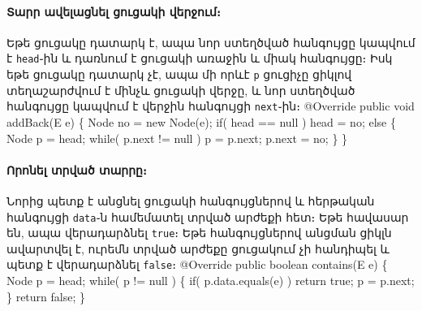 %
%
\paragraph{Տարր ավելացնել ցուցակի վերջում։}
Եթե ցուցակը դատարկ է, ապա նոր ստեղծված հանգույցը կապվում է 
\texttt{head}֊ին և դառնում է ցուցակի առաջին և միակ հանգույցը։
Իսկ եթե ցուցակը դատարկ չէ, ապա մի որևէ \texttt{p} ցուցիչը
ցիկլով տեղաշարժվում է մինչև ցուցակի վերջը, և նոր ստեղծված
հանգույցը կապվում է վերջին հանգույցի \texttt{next}֊ին։
\nwenddocs{}\endmoddef{}
@Override
public void addBack(E e)
\{
  Node no = new Node(e);
  if( head == null )
    head = no;
  else \{
    Node p = head;
    while( p.next != null )
      p = p.next;
    p.next = no;
  \}
\}
\nwendcode{}\nwdocspar

%
%
\paragraph{Որոնել տրված տարրը։}
Նորից պետք է անցնել ցուցակի հանգույցներով և հերթական հանգույցի 
\texttt{data}֊ն համեմատել տրված արժեքի հետ։ Եթե հավասար են, ապա 
վերադարձնել \texttt{true}։ Եթե հանգույցներով անցման ցիկլն 
ավարտվել է, ուրեմն տրված արժեքը ցուցակում չի հանդիպել և պետք 
է վերադարձնել \texttt{false}։
\nwenddocs{}\endmoddef{}
@Override
public boolean contains(E e)
\{
  Node p = head;
  while( p != null ) \{
    if( p.data.equals(e) )
      return true;
    p = p.next;
  \}
  return false;
\}
\nwendcode{}\nwdocspar

%
%
